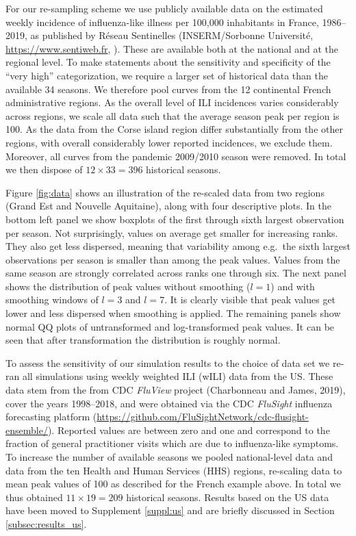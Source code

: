 \documentclass[12pt]{article}
\begin{document}
For our re-sampling scheme we use publicly available data on the estimated weekly incidence of influenza-like illness per 100,000 inhabitants in France, 1986--2019, as published by Réseau Sentinelles (INSERM/Sorbonne Université, \url{https://www.sentiweb.fr}, \citealt{Flahault2006}). These are available both at the national and at the regional level. To make statements about the sensitivity and specificity of the ``very high'' categorization, we require a larger set of historical data than the available 34 seasons. We therefore pool curves from the 12 continental French administrative regions. As the overall level of ILI incidences varies considerably across regions, we scale all data such that the average season peak per region is 100. As the data from the Corse island region differ substantially from the other regions, with overall considerably lower reported incidences, we exclude them. Moreover, all curves from the pandemic 2009/2010 season were removed. In total we then dispose of $12 \times 33 = 396$ historical seasons.

Figure \ref{fig:data} shows an illustration of the re-scaled data from two regions (Grand Est and Nouvelle Aquitaine), along with four descriptive plots. In the bottom left panel we show boxplots of the first through sixth largest observation per season. Not surprisingly, values on average get smaller for increasing ranks. They also get less dispersed, meaning that variability among e.g.\ the sixth largest observations per season is smaller than among the peak values. Values from the same season are strongly correlated across ranks one through six. The next panel shows the distribution of peak values without smoothing ($l = 1$) and with smoothing windows of $l = 3$ and $l = 7$. It is clearly visible that peak values get lower and less dispersed when smoothing is applied. The remaining panels show normal QQ plots of untransformed and log-transformed peak values. It can be seen that after transformation the distribution is roughly normal.

To assess the sensitivity of our simulation results to the choice of data set we re-ran all simulations using  weekly weighted ILI (wILI) data from the US. These data stem from the from CDC \textit{FluView} project (Charbonneau and James, 2019), cover the years 1998–2018, and were
obtained via the CDC \textit{FluSight} influenza forecasting platform (\url{https://github.com/FluSightNetwork/cdc-flusight-ensemble/}). Reported values are between zero and one and correspond to the fraction of general practitioner visits which are due to influenza-like symptoms. To increase the number of available seasons we pooled national-level data and data from the ten Health and Human Services (HHS) regions, re-scaling data to mean peak values of 100 as described for the French example above. In total we thus obtained $11 \times 19 = 209$ historical seasons. Results based on the US data have been moved to Supplement \ref{suppl:us} and are briefly discussed in Section \ref{subsec:results_us}.
\end{document}
